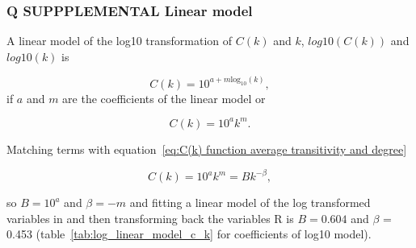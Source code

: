 
 \subsubsection{Q SUPPPLEMENTAL Linear model}
 A linear model of the log10 transformation of $C(k)$ and $k$, $log10(C(k))$ and $log10(k)$ is

\begin{equation}
C(k) = 10^{a + m \textrm{log}_{10}(k)},
\end{equation}
if $a$ and $m$ are the coefficients of the linear model or

\begin{equation}
    C(k) = 10^a k^m.
\end{equation}

Matching terms with equation~\ref{eq:C(k) function average transitivity and degree}

\begin{equation}
    C(k) = 10^a k^m = B k^{-\beta},
\end{equation}

so $B=10^a$ and $\beta=-m$ and fitting a linear model of the log transformed variables in and then transforming back the variables R is $B=0.604$ and $\beta$ = 0.453 (table~\ref{tab:log_linear_model_c_k} for coefficients of log10 model).


